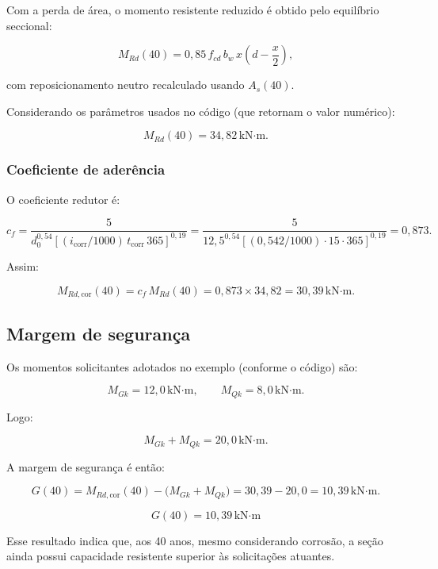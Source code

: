 Com a perda de área, o momento resistente reduzido é obtido pelo equilíbrio seccional:

\[
M_{Rd}(40)
= 0{,}85\, f_{cd} \, b_w \, x \left( d - \frac{x}{2} \right),
\]

com reposicionamento neutro recalculado usando $A_s(40)$.

Considerando os parâmetros usados no código (que retornam o valor numérico):

\[
M_{Rd}(40) = 34{,}82\,\text{kN·m}.
\]

\subsubsection{Coeficiente de aderência}

O coeficiente redutor é:

\[
c_f = 
\dfrac{5}
{ d_0^{0{,}54}
\left[
(i_{\mathrm{corr}}/1000)\, t_{\mathrm{corr}}\, 365
\right]^{0{,}19}}
=
\dfrac{5}
{ 12{,}5^{0{,}54}
\left[
(0{,}542/1000)\cdot 15 \cdot 365
\right]^{0{,}19}}
= 0{,}873.
\]

Assim:

\[
M_{Rd,\mathrm{cor}}(40)
= c_f \, M_{Rd}(40)
= 0{,}873 \times 34{,}82
= 30{,}39\,\text{kN·m}.
\]

\subsection{Margem de segurança}

Os momentos solicitantes adotados no exemplo (conforme o código) são:

\[
M_{Gk} = 12{,}0\,\text{kN·m}, \qquad
M_{Qk} = 8{,}0\,\text{kN·m}.
\]

Logo:

\[
M_{Gk} + M_{Qk} = 20{,}0\,\text{kN·m}.
\]

A margem de segurança é então:

\[
G(40)
= M_{Rd,\mathrm{cor}}(40) - \bigl( M_{Gk} + M_{Qk} \bigr)
= 30{,}39 - 20{,}0
= 10{,}39\,\text{kN·m}.
\]

\[
\boxed{G(40) = 10{,}39\,\text{kN·m}}
\]

Esse resultado indica que, aos 40 anos, mesmo considerando corrosão, a seção ainda possui capacidade resistente superior às solicitações atuantes.
